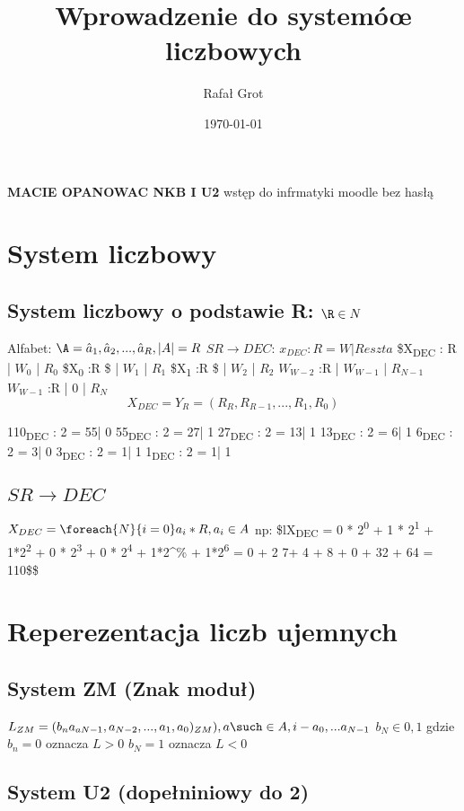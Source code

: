 \documentclass[11pt]{article}
\author{Rafał Grot}
\date{\today}
\title{Wprowadzenie do systemóœ liczbowych}
\begin{document}
\maketitle
\tableofcontents

\textbf{MACIE OPANOWAC NKB I U2}
wstęp do infrmatyki moodle bez hasłą
\section{System liczbowy}
\label{sec:orge56d385}
\subsection{System liczbowy o podstawie R: \(\R \in N\)}
\label{sec:orgd64c767}
Alfabet: \(\A = {\hat{a}_1,\hat{a}_2,...,\hat{a}_R}, |A|=R\)
\(SR \to DEC\):
\(x_{DEC} : R = W | Reszta\)
\$X\textsubscript{DEC} : R | \(W_0\) | \(R_{0}\)
\$X\textsubscript{0} :R \$ | \(W_1\) | \(R_{1}\)
\$X\textsubscript{1} :R \$ | \(W_2\) | \(R_{2}\)
\(W_{W-2}\) :R | \(W_{W-1}\) | \(R_{N-1}\)
\(W_{W-1}\) :R | \(0\) | \(R_{N}\)
$$X_{DEC}=Y_R=(R_R, R_{R-1},...,R_1,R_0)$$

110\textsubscript{DEC} : 2 = 55| 0
55\textsubscript{DEC} : 2  = 27| 1
27\textsubscript{DEC} : 2  = 13| 1
13\textsubscript{DEC} : 2  = 6| 1
6\textsubscript{DEC} : 2  = 3| 0
3\textsubscript{DEC} : 2  = 1| 1
1\textsubscript{DEC} : 2  = 1| 1

\subsection{\(SR \to DEC\)}
\label{sec:org53b415b}
\(X_{DEC} = \foreach{N}{i=0}a_i*R , a_i \in A\)
np:
\$lX\textsubscript{DEC} = 0 * 2\textsuperscript{0} + 1 * 2\textsuperscript{1} + 1*2\textsuperscript{2} + 0 * 2\textsuperscript{3} + 0 * 2\textsuperscript{4} + 1*2\^{}\% + 1*2\textsuperscript{6} = 0 + 2 7+ 4 + 8 + 0 + 32 + 64 = 110\$\$
\section{Reperezentacja liczb ujemnych}
\label{sec:org40343ea}
\subsection{System ZM (Znak moduł)}
\label{sec:org2e8de7b}
\(L_{ZM} = (b_n a_{aN-1}, a_{N-2}, ... , a_{1}, a_0)_{ZM}), a\such \in A, i-a_0,...a_{N-1}\)
\(b_N \in {0,1}\) gdzie \(b_n=0\) oznacza \(L > 0\)
\(b_N=1\) oznacza \(L < 0\)
\subsection{System U2 (dopełniniowy do 2)}
\label{sec:orgf585313}
\end{document}

